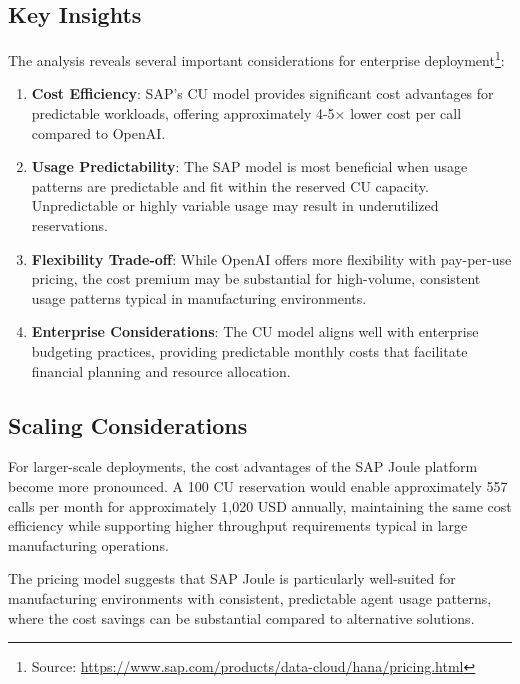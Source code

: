 \subsection{Key Insights}

The analysis reveals several important considerations for enterprise deployment\footnote{Source: \url{https://www.sap.com/products/data-cloud/hana/pricing.html}}:

\begin{enumerate}
    \item \textbf{Cost Efficiency}: SAP's CU model provides significant cost advantages for predictable workloads, offering approximately 4-5× lower cost per call compared to OpenAI.
    
    \item \textbf{Usage Predictability}: The SAP model is most beneficial when usage patterns are predictable and fit within the reserved CU capacity. Unpredictable or highly variable usage may result in underutilized reservations.
    
    \item \textbf{Flexibility Trade-off}: While OpenAI offers more flexibility with pay-per-use pricing, the cost premium may be substantial for high-volume, consistent usage patterns typical in manufacturing environments.
    
    \item \textbf{Enterprise Considerations}: The CU model aligns well with enterprise budgeting practices, providing predictable monthly costs that facilitate financial planning and resource allocation.
\end{enumerate}

\subsection{Scaling Considerations}

For larger-scale deployments, the cost advantages of the SAP Joule platform become more pronounced. A 100 CU reservation would enable approximately 557 calls per month for approximately 1,020 USD annually, maintaining the same cost efficiency while supporting higher throughput requirements typical in large manufacturing operations.

The pricing model suggests that SAP Joule is particularly well-suited for manufacturing environments with consistent, predictable agent usage patterns, where the cost savings can be substantial compared to alternative solutions.


